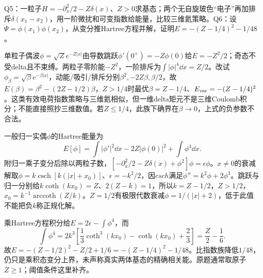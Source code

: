 \begin{exercise}
Q5：一粒子$H=-\partial_x^2/2-Z\delta(x)$、$Z>0$求基态；两个无自旋玻色“电子”再加排斥$\delta(x_1-x_2)$，用一阶微扰和可变指数给能量，比较三维氦策略。Q6：设$\Psi=\phi(x_1)\phi(x_2)$，从变分推Hartree方程并解，证明$E=-(Z-1/4)^2-1/48$。
\end{exercise}
\begin{solution}
单粒子偶波$\phi=\sqrt Z e^{-Z|x|}$由导数跳跃$\phi'(0^+)=-Z\phi(0)$给$E=-Z^2/2$；奇态不受delta且不束缚。两粒子零阶能$-Z^2$，一阶排斥为$\int|\phi|^4\dd x=Z/2$。改试$\phi_\beta=\sqrt\beta e^{-\beta|x|}$，动能/吸引/排斥分别$\beta^2,-2Z\beta,\beta/2$，故$E(\beta)=\beta^2-(2Z-1/2)\beta$，$Z>1/4$时最优$\beta=Z-1/4$、$E_{\rm var}=-(Z-1/4)^2$。这类有效电荷指数策略与三维氦相似，但一维delta矩元不是三维Coulomb积分；不能直接照抄三维数值。若$Z\le1/4$，此族下确界在$\beta\to0$，上式的负参数不合法。

一般归一实偶$\phi$的Hartree能量为
\[
 E[\phi]=\int|\phi'|^2\dd x-2Z|\phi(0)|^2+\int\phi^4\dd x.
\]
附归一乘子变分后除以两粒子数，$[-\partial_x^2/2-Z\delta(x)+\phi^2]\phi=\epsilon\phi$。$x\ne0$的衰减解取$\phi=k\operatorname{csch}[k(|x|+x_0)]$、$\epsilon=-k^2/2$，因$csch$满足$\phi''=k^2\phi+2\phi^3$。跳跃与归一分别给$k\coth(kx_0)=Z$、$2(Z-k)=1$，所以$k=Z-1/2$，$Z>1/2$，$x_0=k^{-1}\operatorname{arccoth}(Z/k)$。$Z=1/2$有极限代数衰减$\phi=1/(|x|+2)$，低于此值不能把负$k$称正规化解。

乘Hartree方程积分给$E=2\epsilon-\int\phi^4$，而
\[
 \int\phi^4=2k^3\left[\frac13\coth^3(kx_0)-\coth(kx_0)+\frac23\right]
 =\frac Z2-\frac16.
\]
故$E=-(Z-1/2)^2-Z/2+1/6=-(Z-1/4)^2-1/48$。比指数族降低$1/48$，仍只是乘积态变分上界，未声称真实两体基态的精确相关能。原题通常取原子$Z\ge1$；阈值条件这里补齐。
\end{solution}
